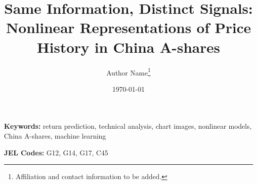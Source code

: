 \documentclass[11pt]{article}
\title{Same Information, Distinct Signals:\\
Nonlinear Representations of Price History in China A-shares}
\author{
  Author Name\thanks{Affiliation and contact information to be added.}
}
\date{\today}
\begin{document}
\maketitle

\begin{abstract}

\end{abstract}

\noindent\textbf{Keywords:} return prediction, technical analysis, chart images, nonlinear models, China A-shares, machine learning

\noindent\textbf{JEL Codes:} G12, G14, G17, C45

\newpage

















\appendix

\end{document}
